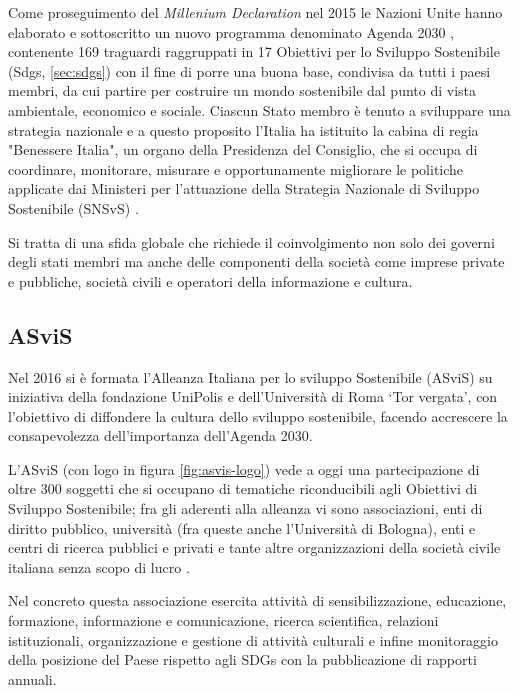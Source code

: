 Come proseguimento del \textit{Millenium Declaration} nel 2015 le Nazioni Unite hanno elaborato e sottoscritto un nuovo programma denominato Agenda 2030 \cite{agenda2030}, contenente 169 traguardi raggruppati in 17 Obiettivi per lo Sviluppo Sostenibile (Sdgs, \ref{sec:sdgs}) con il fine di porre una buona base, condivisa da tutti i paesi membri, da cui partire per costruire un mondo sostenibile dal punto di vista ambientale, economico e sociale.
%
Ciascun Stato membro è tenuto a sviluppare una strategia nazionale e a questo proposito l'Italia ha istituito la cabina di regia "Benessere Italia", un organo della Presidenza del Consiglio, che si occupa di coordinare, monitorare, misurare e opportunamente migliorare le politiche applicate dai Ministeri per l'attuazione della Strategia Nazionale di Sviluppo Sostenibile (SNSvS) \cite{SNSvS}.

Si tratta di una sfida globale che richiede il coinvolgimento non solo dei governi degli stati membri ma anche delle componenti della società come imprese private e pubbliche, società civili e operatori della informazione e cultura.

\subsection{ASviS}
Nel 2016 si è formata l'Alleanza Italiana per lo sviluppo Sostenibile (ASviS) \cite{asvis} su iniziativa della fondazione UniPolis e dell'Università di Roma \enquote*{Tor vergata}, con l'obiettivo di diffondere la cultura dello sviluppo sostenibile, facendo accrescere la consapevolezza dell'importanza dell'Agenda 2030. 

L'ASviS (con logo in figura \ref{fig:asvis-logo}) vede a oggi una partecipazione di oltre 300 soggetti che si occupano di tematiche riconducibili agli Obiettivi di Sviluppo Sostenibile; fra gli aderenti alla alleanza vi sono associazioni, enti di diritto pubblico, università (fra queste anche l'Università di Bologna), enti e centri di ricerca pubblici e privati e tante altre organizzazioni della società civile italiana senza scopo di lucro \cite[Aderenti alla ASviS]{aderenti_asvis}.

Nel concreto questa associazione esercita attività di sensibilizzazione, educazione, formazione, informazione e comunicazione, ricerca scientifica, relazioni istituzionali, organizzazione e gestione di attività culturali e infine monitoraggio della posizione del Paese rispetto agli SDGs con la pubblicazione di rapporti annuali.

